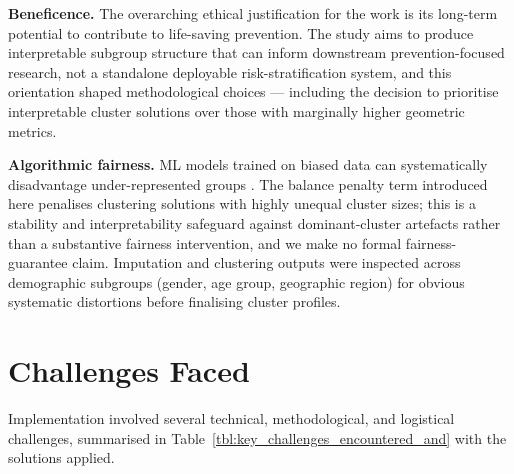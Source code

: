 \textbf{Beneficence.} The overarching ethical justification for the work is its long-term potential to contribute to life-saving prevention. The study aims to produce interpretable subgroup structure that can inform downstream prevention-focused research, not a standalone deployable risk-stratification system, and this orientation shaped methodological choices --- including the decision to prioritise interpretable cluster solutions over those with marginally higher geometric metrics.

\textbf{Algorithmic fairness.} ML models trained on biased data can systematically disadvantage under-represented groups \cite{ref45,ref46}. The balance penalty term introduced here penalises clustering solutions with highly unequal cluster sizes; this is a stability and interpretability safeguard against dominant-cluster artefacts rather than a substantive fairness intervention, and we make no formal fairness-guarantee claim. Imputation and clustering outputs were inspected across demographic subgroups (gender, age group, geographic region) for obvious systematic distortions before finalising cluster profiles.

\section{Challenges Faced}

Implementation involved several technical, methodological, and logistical challenges, summarised in Table~\ref{tbl:key_challenges_encountered_and} with the solutions applied.

